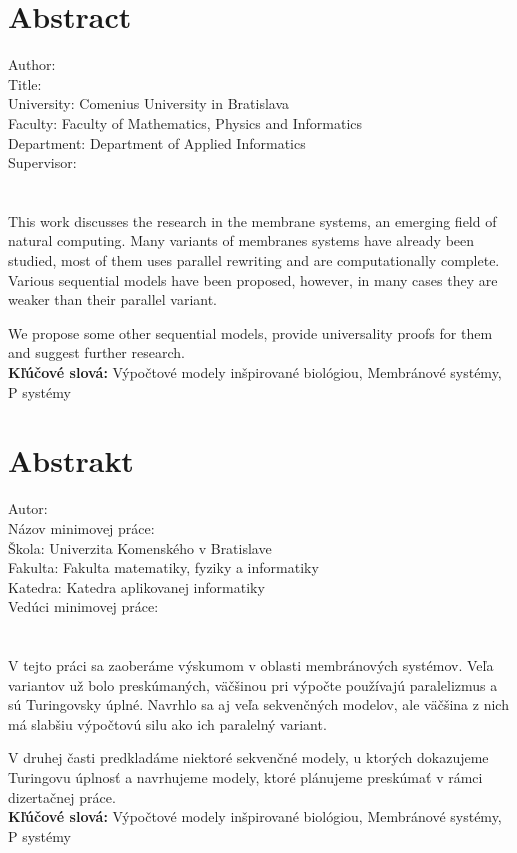 \chapter*{Abstract}
Author: \mfauthor\\
Title: \mftitle\\
University: Comenius University in Bratislava\\
Faculty: Faculty of Mathematics, Physics and Informatics\\
Department: Department of Applied Informatics\\
Supervisor: \mfadvisor\\
\mfplacedate\\\\

This work discusses the research in the membrane systems, an emerging field of natural computing. Many variants of membranes systems have already been studied, most of them uses parallel rewriting and are computationally complete. Various sequential models have been proposed, however, in many cases they are weaker than their parallel variant.

We propose some other sequential models, provide universality proofs for them and suggest further research.\\

{\bf Kľúčové slová: }Výpočtové modely inšpirované biológiou, Membránové systémy, P systémy

\chapter*{Abstrakt}
Autor: \mfauthor\\
Názov minimovej práce: \mftitle\\
Škola: Univerzita Komenského v Bratislave\\
Fakulta: Fakulta matematiky, fyziky a informatiky\\
Katedra: Katedra aplikovanej informatiky\\
Vedúci minimovej práce: \mfadvisor\\
\mfplacedate\\\\

V tejto práci sa zaoberáme výskumom v oblasti membránových systémov. Veľa variantov už bolo preskúmaných, väčšinou pri výpočte používajú paralelizmus a sú Turingovsky úplné. Navrhlo sa aj veľa sekvenčných modelov, ale väčšina z nich má slabšiu výpočtovú silu ako ich paralelný variant.

V druhej časti predkladáme niektoré sekvenčné modely, u ktorých dokazujeme Turingovu úplnosť a navrhujeme modely, ktoré plánujeme preskúmať v rámci dizertačnej práce.\\

{\bf Kľúčové slová: }Výpočtové modely inšpirované biológiou, Membránové systémy, P systémy
